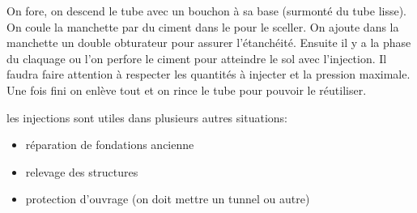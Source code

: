 On fore, on descend le tube avec un bouchon à sa base (surmonté du tube lisse). On coule la manchette par du ciment dans le pour le sceller. On ajoute dans la manchette un double obturateur pour assurer l'étanchéité. Ensuite il y a la phase du claquage ou l'on perfore le ciment pour atteindre le sol avec l'injection. Il faudra faire attention à respecter les quantités à injecter et la pression maximale. Une fois fini on enlève tout et on rince le tube pour pouvoir le réutiliser.

\medskip

les injections sont utiles dans plusieurs autres situations:
\begin{itemize}
    \item réparation de fondations ancienne
    \item relevage des structures
    \item protection d'ouvrage (on doit mettre un tunnel ou autre)
\end{itemize}

